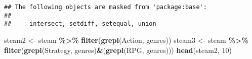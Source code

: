 \documentclass[
]{article}
\newenvironment{Shaded}{\begin{snugshade}}{\end{snugshade}}
\newcommand{\DecValTok}[1]{\textcolor[rgb]{0.00,0.00,0.81}{#1}}
\newcommand{\FunctionTok}[1]{\textcolor[rgb]{0.13,0.29,0.53}{\textbf{#1}}}
\newcommand{\NormalTok}[1]{#1}
\newcommand{\OtherTok}[1]{\textcolor[rgb]{0.56,0.35,0.01}{#1}}
\newcommand{\SpecialCharTok}[1]{\textcolor[rgb]{0.81,0.36,0.00}{\textbf{#1}}}
\newcommand{\StringTok}[1]{\textcolor[rgb]{0.31,0.60,0.02}{#1}}
\begin{document}
\begin{verbatim}
## The following objects are masked from 'package:base':
## 
##     intersect, setdiff, setequal, union
\end{verbatim}

\begin{Shaded}
\begin{Highlighting}[]
\NormalTok{steam2 }\OtherTok{\textless{}{-}}\NormalTok{ steam }\SpecialCharTok{\%\textgreater{}\%} \FunctionTok{filter}\NormalTok{(}\FunctionTok{grepl}\NormalTok{(}\StringTok{\textquotesingle{}Action\textquotesingle{}}\NormalTok{, genres))}
\NormalTok{steam3 }\OtherTok{\textless{}{-}}\NormalTok{ steam }\SpecialCharTok{\%\textgreater{}\%} \FunctionTok{filter}\NormalTok{(}\FunctionTok{grepl}\NormalTok{(}\StringTok{\textquotesingle{}Strategy\textquotesingle{}}\NormalTok{, genres)}\SpecialCharTok{\&}\NormalTok{(}\FunctionTok{grepl}\NormalTok{(}\StringTok{\textquotesingle{}RPG\textquotesingle{}}\NormalTok{, genres)))}
\FunctionTok{head}\NormalTok{(steam2, }\DecValTok{10}\NormalTok{)}
\end{Highlighting}
\end{Shaded}
\end{document}
